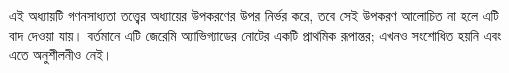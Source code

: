 \documentclass[../../../include/open-logic-chapter]{subfiles}
\begin{document}
\begin{editorial}
  এই অধ্যায়টি গণনসাধ্যতা তত্ত্বের অধ্যায়ের উপকরণের উপর নির্ভর করে, তবে
  সেই উপকরণ আলোচিত না হলে এটি বাদ দেওয়া যায়। বর্তমানে এটি জেরেমি
  অ্যাভিগ্যাডের নোটের একটি প্রাথমিক রূপান্তর; এখনও সংশোধিত হয়নি এবং এতে
  অনুশীলনীও নেই।
\end{editorial}












\OLEndChapterHook
\end{document}
